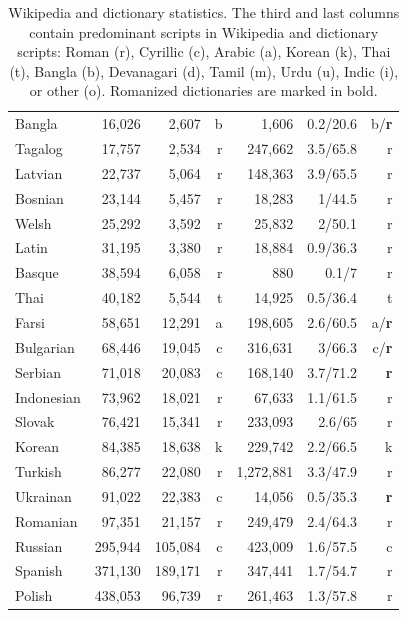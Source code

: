 \documentclass{article}
\newcommand{\mnote}[1]{\marginpar{%
  \vskip-\baselineskip
  \raggedright\footnotesize
  \itshape\hrule\smallskip\tiny{#1}\par\smallskip\hrule}}
\newcommand{\mtodo}[1]{\mnote{\textcolor{red}{#1}}}
\begin{document}
\begin{table}[h!]
\begin{center}
\begin{tabular}{l|rrr|rrr|}
Bangla 	&	16,026	&	2,607	&	b	&	1,606	&	0.2/20.6	&	b/{\bf r}\\
Tagalog	&	17,757	&	2,534	&	r	&	247,662	&	3.5/65.8	&	r\\
Latvian	&	22,737	&	5,064	&	r	&	148,363	&	3.9/65.5	&	r\\
Bosnian 	&	23,144	&	5,457	&	r	&	18,283	&	1/44.5	&	r\\
Welsh	&	25,292	&	3,592	&	r	&	25,832	&	2/50.1	&	r\\
Latin 	&	31,195	&	3,380	&	r	&	18,884	&	0.9/36.3	&	r\\
Basque 	&	38,594	&	6,058	&	r	&	880	&	0.1/7	&	r\\
Thai	&	40,182	&	5,544	&	t	&	14,925	&	0.5/36.4	&	t\\
Farsi	&	58,651	&	12,291	&	a	&	198,605	&	2.6/60.5	&	a/{\bf r}\\
Bulgarian 	&	68,446	&	19,045	&	c	&	316,631	&	3/66.3	&	c/{\bf r}\\
Serbian	&	71,018	&	20,083	&	c	&	168,140	&	3.7/71.2	&	{\bf r}\\
Indonesian 	&	73,962	&	18,021	&	r	&	67,633	&	1.1/61.5	&	r\\
Slovak 	&	76,421	&	15,341&	r	&	233,093	&	2.6/65	&	r\\
Korean	&	84,385	&	18,638		&	k	&	229,742	&	2.2/66.5	&	k\\
Turkish 	&	86,277	&	22,080	&	r	&	1,272,881	&	3.3/47.9	&	r\\
Ukrainan	&	91,022	&	22,383	&	c	&	14,056	&	0.5/35.3	&	{\bf r}\\
Romanian	&	97,351	&	21,157	&	r	&	249,479	&	2.4/64.3	&	r\\
Russian	&	295,944	&	105,084	&	c	&	423,009	&	1.6/57.5	&	c\\
Spanish 	&	371,130	&	189,171	&	r	&	347,441	&	1.7/54.7	&	r\\
Polish	&	438,053	&	96,739	&	r	&	261,463	&	1.3/57.8	&	r\\
\end{tabular}
\end{center}
\normalsize
\caption{Wikipedia and dictionary statistics. The third and last columns contain predominant scripts in Wikipedia and dictionary scripts: Roman (r), Cyrillic (c), Arabic (a), Korean (k), Thai (t), Bangla (b), Devanagari (d), Tamil (m),  Urdu (u), Indic (i), or other (o).  Romanized dictionaries are marked in bold.}
\label{fig:wikidictstats}
\end{table}

\mtodo{If we drop phrases, dict sizes decrease by 1/3 to 1/2}
\end{document}
